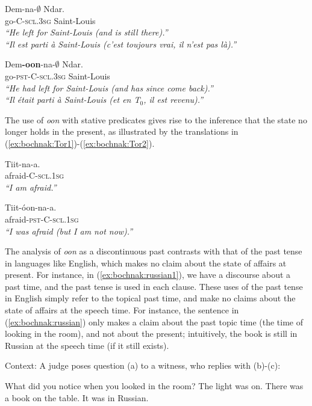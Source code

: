 \documentclass[output=paper,newtxmath,modfonts,nonflat,draftmode]{langsci/langscibook}
\begin{document}
\ea
\gll Dem-na-$\emptyset$ Ndar.\\
go-C-\textsc{scl.3sg} Saint-Louis\\
\glt \textit{``He left for Saint-Louis (and is still there).''}\\
\textit{``Il est parti \`a Saint-Louis (c'est toujours vrai, il n'est
  pas l\`a).''} \hfill \citep[p.~279]{robert91approche}\label{ex:bochnak:Robert1}
\z

\ea
\gll Dem\textbf{-oon}-na-$\emptyset$ Ndar.\\
go-\textsc{pst}-C-\textsc{scl.3sg} Saint-Louis\\
\glt \textit{``He had left for Saint-Louis (and has since come
  back).''}\\\textit{``Il \'etait parti \`a Saint-Louis (et en T$_0$,
  il est revenu).''} \hfill \citep[p.~279]{robert91approche}\label{ex:bochnak:Robert2}
\z


The use of \textit{oon} with stative predicates gives rise to the inference that the state no longer holds in the present, as illustrated by the translations in (\ref{ex:bochnak:Tor1})-(\ref{ex:bochnak:Tor2}).

\ea
\gll Tiit-na-a.\\
afraid-C-\textsc{scl.1sg}\\
\glt \textit{``I am afraid.''}\hfill\citep[p.~25]{torrence12clause}\label{ex:bochnak:Tor1}
\z

\ea
\gll Tiit-\'oon-na-a.\\
afraid-\textsc{pst}-C-\textsc{scl.1sg}\\
\glt \textit{``I was afraid (but I am not now).''}\hfill\citep[p.~26]{torrence12clause}\label{ex:bochnak:Tor2}
\z

The analysis of \textit{oon} as a discontinuous past contrasts with that of the past tense in languages like English, which makes no claim about the state of affairs at present. For instance, in (\ref{ex:bochnak:russian1}), we have a discourse about a past time, and the past tense is used in each clause. These uses of the past tense in English simply refer to the topical past time, and make no claims about the state of affairs at the speech time. For instance, the sentence in (\ref{ex:bochnak:russian}) only makes a claim about the past topic time (the time of looking in the room), and not about the present; intuitively, the book is still in Russian at the speech time (if it still exists).

\begin{exe}
\ex\label{ex:bochnak:russian1} Context: A judge poses question (a) to a witness, who replies with (b)-(c):
\begin{xlist}
\ex What did you notice when you looked in the room?
\ex The light was on. There was a book on the table.
\ex\label{ex:bochnak:russian} It was in Russian. \hfill \citep{klein94time}
\end{xlist}
\end{exe}
\end{document}
